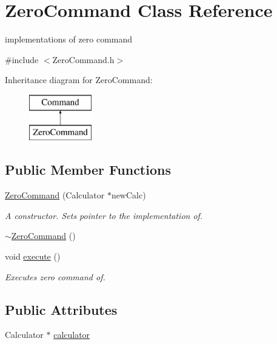 \hypertarget{class_zero_command}{}\section{Zero\+Command Class Reference}
\label{class_zero_command}


implementations of zero command  




{\ttfamily \#include $<$Zero\+Command.\+h$>$}

Inheritance diagram for Zero\+Command\+:\begin{figure}[H]
\begin{center}
\leavevmode
\includegraphics[height=2.000000cm]{class_zero_command}
\end{center}
\end{figure}
\subsection*{Public Member Functions}
\begin{DoxyCompactItemize}
\item 
\hyperlink{class_zero_command_aead23519dff0be47aaab54ebc6f6a2cf}{Zero\+Command} (Calculator $\ast$new\+Calc)
\begin{DoxyCompactList}\small\item\em A constructor. Sets pointer to the implementation of. \end{DoxyCompactList}\item 
\hyperlink{class_zero_command_acaad9ef9ac9512d3dddab0636fad73ef}{$\sim$\+Zero\+Command} ()
\item 
void \hyperlink{class_zero_command_ad36f2d99253252274f1bfaa3c5d81c7b}{execute} ()
\begin{DoxyCompactList}\small\item\em Executes zero command of. \end{DoxyCompactList}\end{DoxyCompactItemize}
\subsection*{Public Attributes}
\begin{DoxyCompactItemize}
\item 
Calculator $\ast$ \hyperlink{class_zero_command_ad478b56405cd23b5c4a597a0c320bef0}{calculator}
\end{DoxyCompactItemize}


